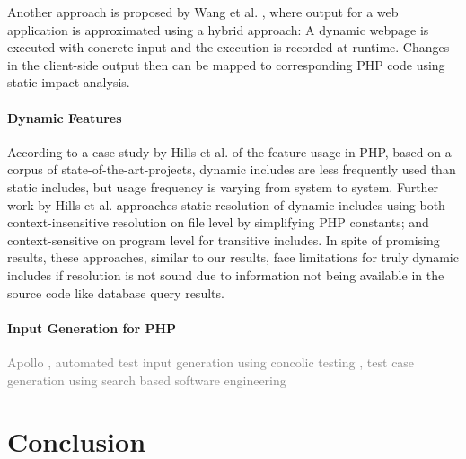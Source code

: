 \documentclass[sigconf]{acmart}
\begin{document}
Another approach is proposed by Wang et al. \cite{wang_automating_2012}, where
output for a web application is approximated using a hybrid approach: A
dynamic webpage is executed with concrete input and the execution is
recorded at runtime. Changes in the client-side output then can be mapped to 
corresponding PHP code using static impact analysis.

\paragraph{Dynamic Features}
According to a case study by Hills et al. \cite{Hills:2013:ESP:2483760.2483786}
of the feature usage in PHP, based on a corpus of state-of-the-art-projects,
dynamic includes are less frequently used than static includes, but usage
frequency is varying from system to system. Further work by Hills et al.
\cite{hills2014static,hills2014php} approaches static resolution of dynamic includes using
both context-insensitive resolution on file level by simplifying PHP constants; and context-sensitive on program level for transitive includes. In spite of
promising results, these approaches, similar to our results, face limitations
for truly dynamic includes if resolution is not sound due to information not
being available in the source code like database query results. 

\paragraph{Input Generation for PHP}
\textcolor{gray}{Apollo \cite{artzi_finding_2008,artzi_finding_2010}, automated
test input generation using concolic testing \cite{DynamicWassermann}, test case generation
using search based software engineering \cite{Alshahwan2011}}



\section{Conclusion}



 
\end{document}
